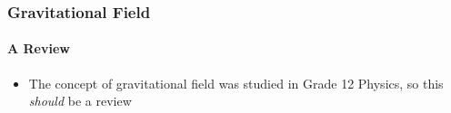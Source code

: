 \documentclass[12pt,compress,aspectratio=169]{beamer}
\begin{document}
\begin{frame}
  \frametitle{Gravitational Field}
  \framesubtitle{A Review}
  \begin{itemize}
  \item The concept of gravitational field was studied in Grade 12 Physics, so
    this \emph{should} be a review
  \end{itemize}
%
\end{frame}
\end{document}

